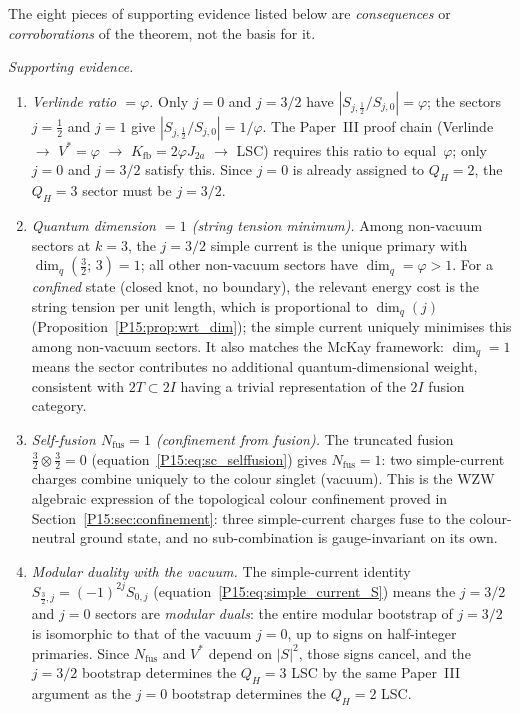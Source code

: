 \documentclass[11pt,a4paper]{article}
\theoremstyle{definition}\newtheorem{definition}[theorem]{Definition}
\theoremstyle{remark}
\newcommand{\vp}{\varphi}
\newcommand{\Ja}{J_{2a}}
\newcommand{\Kfb}{K_{\mathrm{fb}}}
\newcommand{\twoI}{2I}
\newcommand{\twoT}{2T}
\newcommand{\QH}{Q_H}
\begin{document}
\noindent The eight pieces of supporting evidence listed below are
\emph{consequences} or \emph{corroborations} of the theorem,
not the basis for it.

\noindent\emph{Supporting evidence.}
\begin{enumerate}[label=\textup{(\alph*)}]
\item \emph{Verlinde ratio $=\vp$.}
  Only $j=0$ and $j=3/2$ have
  $|S_{j,\frac12}/S_{j,0}|=\vp$; the sectors $j=\tfrac{1}{2}$
  and $j=1$ give $|S_{j,\frac12}/S_{j,0}|=1/\vp$.
  The Paper~III proof chain (Verlinde $\to$ $V^*{=}\vp$
  $\to$ $\Kfb{=}2\vp\Ja$ $\to$ LSC) requires this ratio to
  equal~$\vp$; only $j=0$ and $j=3/2$ satisfy this.
  Since $j=0$ is already assigned to $\QH=2$,
  the $\QH=3$ sector must be $j=3/2$.

\item \emph{Quantum dimension $=1$ (string tension minimum).}
  Among non-vacuum sectors at $k=3$, the $j=3/2$ simple current is
  the unique primary with $\dim_q(\tfrac{3}{2};\,3)=1$; all other
  non-vacuum sectors have $\dim_q=\vp>1$.
  For a \emph{confined} state (closed knot, no boundary), the
  relevant energy cost is the string tension per unit length, which
  is proportional to $\dim_q(j)$ (Proposition~\ref{P15:prop:wrt_dim});
  the simple current uniquely minimises this among non-vacuum sectors.
  It also matches the McKay framework: $\dim_q=1$ means the sector
  contributes no additional quantum-dimensional weight,
  consistent with $\twoT\subset\twoI$ having a trivial
  representation of the $\twoI$ fusion category.

\item \emph{Self-fusion $N_{\mathrm{fus}}=1$ (confinement from fusion).}
  The truncated fusion $\tfrac{3}{2}\otimes\tfrac{3}{2}=0$
  (equation~\eqref{P15:eq:sc_selffusion}) gives $N_{\mathrm{fus}}=1$:
  two simple-current charges combine uniquely to the colour singlet
  (vacuum).
  This is the WZW algebraic expression of the topological colour
  confinement proved in Section~\ref{P15:sec:confinement}: three
  simple-current charges fuse to the colour-neutral ground state,
  and no sub-combination is gauge-invariant on its own.

\item \emph{Modular duality with the vacuum.}
  The simple-current identity $S_{\frac32,j}=(-1)^{2j}S_{0,j}$
  (equation~\eqref{P15:eq:simple_current_S}) means the $j=3/2$ and
  $j=0$ sectors are \emph{modular duals}: the entire modular
  bootstrap of $j=3/2$ is isomorphic to that of the vacuum $j=0$,
  up to signs on half-integer primaries.
  Since $N_{\mathrm{fus}}$ and $V^*$ depend on $|S|^2$, those signs
  cancel, and the $j=3/2$ bootstrap determines the $\QH=3$ LSC by
  the same Paper~III argument as the $j=0$ bootstrap determines
  the $\QH=2$ LSC.


\end{enumerate}
\end{document}
